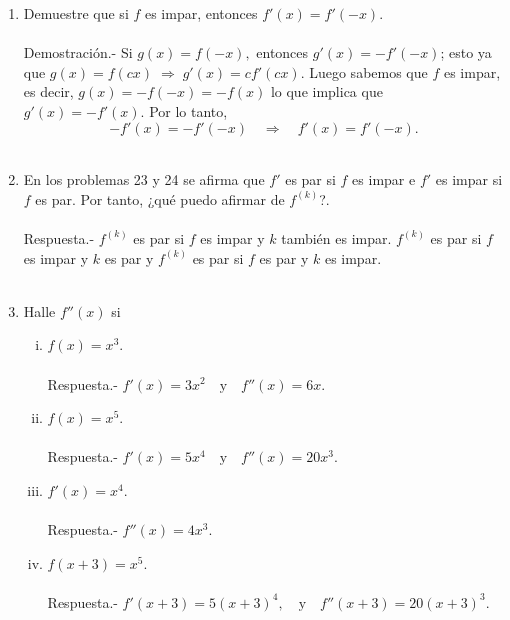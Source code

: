 \begin{enumerate}[\bfseries 1]
    \item Demuestre que si $f$ es impar, entonces $f'(x)=f'(-x)$. \\\\
	Demostración.-\; Si $g(x)=f(-x),$ entonces $g'(x)=-f'(-x)$; esto ya que $g(x)=f(cx)\; \Rightarrow \; g'(x)=cf'(cx)$. Luego sabemos que $f$ es impar, es decir, $g(x)=-f(-x)=-f(x)$ lo que implica que $g'(x)=-f'(x)$. Por lo tanto, 
	$$-f'(x)=-f'(-x) \quad \Rightarrow \quad f'(x)=f'(-x).$$\\

    \item En los problemas 23 y 24 se afirma que $f'$ es par si $f$ es impar e $f'$ es impar si $f$ es par. Por tanto, ¿qué puedo afirmar de $f^{(k)}$?.\\\\
	Respuesta.- $f^{(k)}$ es par si $f$ es impar y $k$ también es impar. $f^{(k)}$ es par si $f$ es impar y $k$ es par y $f^{(k)}$ es par si $f$ es par y $k$ es impar.\\\\

    \item Halle $f''(x)$ si\\

	\begin{enumerate}[(i)]

	    \item $f(x)=x^3$.\\\\
		Respuesta.-\; $f'(x)=3x^2 \quad \mbox{y}\quad f''(x)=6x.$\\

	    \item $f(x)=x^5$.\\\\
		Respuesta.-\; $f'(x)=5x^4\quad \mbox{y}\quad f''(x)=20x^3.$\\

	    \item $f'(x)=x^4$.\\\\
		Respuesta.-\; $f''(x)=4x^3.$\\

	    \item $f(x+3)=x^5$.\\\\
		Respuesta.-\; $f'(x+3)=5(x+3)^4,\quad \mbox{y}\quad f''(x+3)=20(x+3)^3.$\\\\


\end{enumerate}
\end{enumerate}
